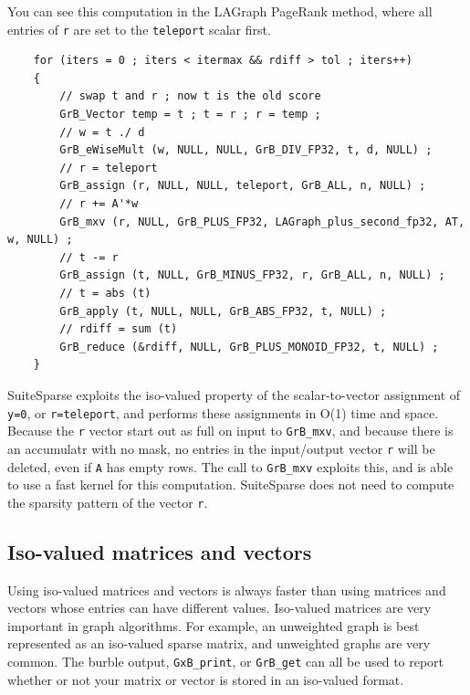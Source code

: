 You can see this computation in the LAGraph PageRank method, where all
entries of \verb'r' are set to the \verb'teleport' scalar first.

    {\footnotesize
    \begin{verbatim}
    for (iters = 0 ; iters < itermax && rdiff > tol ; iters++)
    {
        // swap t and r ; now t is the old score
        GrB_Vector temp = t ; t = r ; r = temp ;
        // w = t ./ d
        GrB_eWiseMult (w, NULL, NULL, GrB_DIV_FP32, t, d, NULL) ;
        // r = teleport
        GrB_assign (r, NULL, NULL, teleport, GrB_ALL, n, NULL) ;
        // r += A'*w
        GrB_mxv (r, NULL, GrB_PLUS_FP32, LAGraph_plus_second_fp32, AT, w, NULL) ;
        // t -= r
        GrB_assign (t, NULL, GrB_MINUS_FP32, r, GrB_ALL, n, NULL) ;
        // t = abs (t)
        GrB_apply (t, NULL, NULL, GrB_ABS_FP32, t, NULL) ;
        // rdiff = sum (t)
        GrB_reduce (&rdiff, NULL, GrB_PLUS_MONOID_FP32, t, NULL) ;
    } \end{verbatim}}

SuiteSparse exploits the iso-valued property of the scalar-to-vector assignment
of \verb'y=0', or \verb'r=teleport', and performs these assignments in O(1)
time and space.  Because the \verb'r' vector start out as full on input to
\verb'GrB_mxv', and because there is an accumulatr with no mask, no entries in
the input/output vector \verb'r' will be deleted, even if \verb'A' has empty
rows.  The call to \verb'GrB_mxv' exploits this, and is able to use a fast
kernel for this computation.  SuiteSparse does not need to compute the sparsity
pattern of the vector \verb'r'.

\subsection{Iso-valued matrices and vectors}

Using iso-valued matrices and vectors is always faster than using matrices and
vectors whose entries can have different values.  Iso-valued matrices are very
important in graph algorithms.  For example, an unweighted graph is best
represented as an iso-valued sparse matrix, and unweighted graphs are very
common.  The burble output, \verb'GxB_print', or \verb'GrB_get'
can all be used to report whether or not your matrix or
vector is stored in an iso-valued format.

